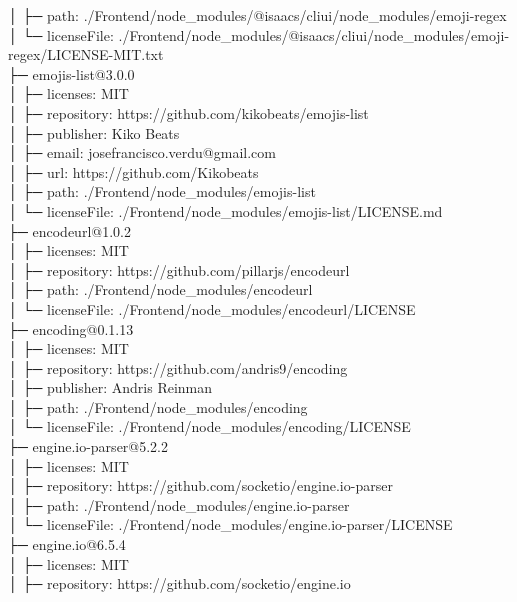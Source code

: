 \documentclass[
    paper=a4,
    twoside=false,
    parskip=half,
    listof=entryprefix,
    listof=totoc,
    index=totoc,
    bibliography=totoc,
    headsepline,
]{scrbook}
\begin{document}
    │  ├─ path: ./Frontend/node\_modules/@isaacs/cliui/node\_modules/emoji-regex\\
    │  └─ licenseFile: ./Frontend/node\_modules/@isaacs/cliui/node\_modules/emoji-regex/LICENSE-MIT.txt\\
    ├─ emojis-list@3.0.0\\
    │  ├─ licenses: MIT\\
    │  ├─ repository: https://github.com/kikobeats/emojis-list\\
    │  ├─ publisher: Kiko Beats\\
    │  ├─ email: josefrancisco.verdu@gmail.com\\
    │  ├─ url: https://github.com/Kikobeats\\
    │  ├─ path: ./Frontend/node\_modules/emojis-list\\
    │  └─ licenseFile: ./Frontend/node\_modules/emojis-list/LICENSE.md\\
    ├─ encodeurl@1.0.2\\
    │  ├─ licenses: MIT\\
    │  ├─ repository: https://github.com/pillarjs/encodeurl\\
    │  ├─ path: ./Frontend/node\_modules/encodeurl\\
    │  └─ licenseFile: ./Frontend/node\_modules/encodeurl/LICENSE\\
    ├─ encoding@0.1.13\\
    │  ├─ licenses: MIT\\
    │  ├─ repository: https://github.com/andris9/encoding\\
    │  ├─ publisher: Andris Reinman\\
    │  ├─ path: ./Frontend/node\_modules/encoding\\
    │  └─ licenseFile: ./Frontend/node\_modules/encoding/LICENSE\\
    ├─ engine.io-parser@5.2.2\\
    │  ├─ licenses: MIT\\
    │  ├─ repository: https://github.com/socketio/engine.io-parser\\
    │  ├─ path: ./Frontend/node\_modules/engine.io-parser\\
    │  └─ licenseFile: ./Frontend/node\_modules/engine.io-parser/LICENSE\\
    ├─ engine.io@6.5.4\\
    │  ├─ licenses: MIT\\
    │  ├─ repository: https://github.com/socketio/engine.io\\
\end{document}
